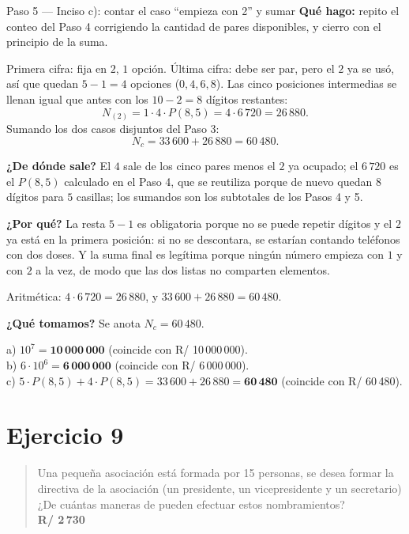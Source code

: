 \documentclass[11pt]{article}
\begin{document}
\begin{paso}{Paso 5 --- Inciso c): contar el caso ``empieza con 2'' y sumar}
\textbf{Qué hago:} repito el conteo del Paso 4 corrigiendo la cantidad de pares disponibles, y cierro con el principio de la suma.

Primera cifra: fija en $2$, $1$ opción. Última cifra: debe ser par, pero el $2$ ya se usó, así que quedan $5-1=4$ opciones ($0,4,6,8$). Las cinco posiciones intermedias se llenan igual que antes con los $10-2=8$ dígitos restantes:
\[
  N_{(2)} = 1\cdot 4\cdot P(8,5) = 4\cdot 6\,720 = 26\,880 .
\]
Sumando los dos casos disjuntos del Paso 3:
\[
  N_c = 33\,600 + 26\,880 = 60\,480 .
\]

\textbf{¿De dónde sale?} El $4$ sale de los cinco pares menos el $2$ ya ocupado; el $6\,720$ es el $P(8,5)$ calculado en el Paso 4, que se reutiliza porque de nuevo quedan $8$ dígitos para $5$ casillas; los sumandos son los subtotales de los Pasos 4 y 5.

\textbf{¿Por qué?} La resta $5-1$ es obligatoria porque no se puede repetir dígitos y el $2$ ya está en la primera posición: si no se descontara, se estarían contando teléfonos con dos doses. Y la suma final es legítima porque ningún número empieza con $1$ y con $2$ a la vez, de modo que las dos listas no comparten elementos.

Aritmética: $4\cdot 6\,720=26\,880$, y $33\,600+26\,880=60\,480$.

\textbf{¿Qué tomamos?} Se anota $N_c=60\,480$.
\end{paso}

\begin{resp}
a) $10^7=\mathbf{10\,000\,000}$ (coincide con R/ 10\,000\,000).\\
b) $6\cdot 10^6=\mathbf{6\,000\,000}$ (coincide con R/ 6\,000\,000).\\
c) $5\cdot P(8,5)+4\cdot P(8,5)=33\,600+26\,880=\mathbf{60\,480}$ (coincide con R/ 60\,480).
\end{resp}

\section*{Ejercicio 9}

\begin{quote}
Una pequeña asociación está formada por 15 personas, se desea formar la directiva de la asociación (un presidente, un vicepresidente y un secretario) ¿De cuántas maneras de pueden efectuar estos nombramientos?\\[2pt]
\textbf{R/ 2\,730}
\end{quote}
\end{document}
